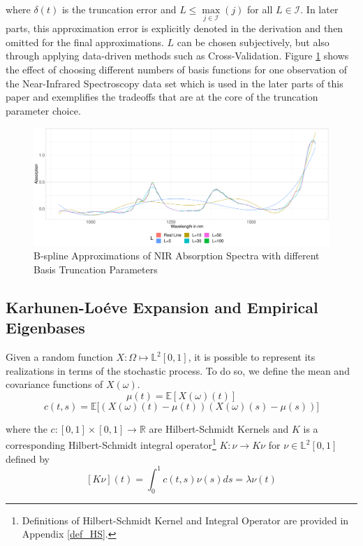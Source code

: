 \documentclass[11pt,twoside,a4paper]{article}
\begin{document}
	where $\delta(t)$ is the truncation error and $L \leq \max\limits_{j \in \mathcal{I}}(j)$ for all $L \in \mathcal{I}$.  In later parts, this approximation error is explicitly denoted in the derivation and then omitted for the final approximations. $L$ can be chosen subjectively, but also through applying data-driven methods such as Cross-Validation. Figure \ref{Different_Expansions} shows the effect of choosing different numbers of basis functions for one observation of the Near-Infrared Spectroscopy data set which is used in the later parts of this paper and exemplifies the tradeoffs that are at the core of the truncation parameter choice.
			
	\begin{figure}[H]
		\includegraphics[width=\textwidth]{../Graphics/basis_expansions.pdf}
		\caption{B-spline Approximations of NIR Absorption Spectra with different Basis Truncation Parameters}
		\label{Different_Expansions}
	\end{figure}
	
	\subsection{Karhunen-Lo\'{e}ve Expansion and Empirical Eigenbases}\hypertarget{KL}{}
	Given a random function $X: \Omega \mapsto \mathbb{L}^2[0,1]$, it is possible to represent its realizations in terms of the stochastic process. To do so, we define the mean and covariance functions of $X(\omega)$.
	\begin{equation}\label{MeanFunction}
		\mu(t) = \mathbb{E}\left[ X(\omega)(t) \right]
	\end{equation}
	\begin{equation}\label{CovarianceFunction}
		c(t,s) = \mathbb{E}\big[ \left( X(\omega)(t) - \mu(t) \right) \left( X(\omega)(s) - \mu(s) \right) \big]
	\end{equation}

	where the $c: [0,1] \times [0,1] \rightarrow \mathbb{R}$ are Hilbert-Schmidt Kernels and $K$ is a corresponding Hilbert-Schmidt integral operator\footnote{Definitions of Hilbert-Schmidt Kernel and Integral Operator are provided in Appendix \ref{def_HS}.} $K : \nu \rightarrow K \nu$ for $\nu \in \mathbb{L}^{2}[0,1]$ defined by
	\begin{equation}\label{HSKernal}
		[K \nu](t) = \int_{0}^{1}c(t,s) \nu(s)ds = \lambda \nu(t)
	\end{equation}
\end{document}
